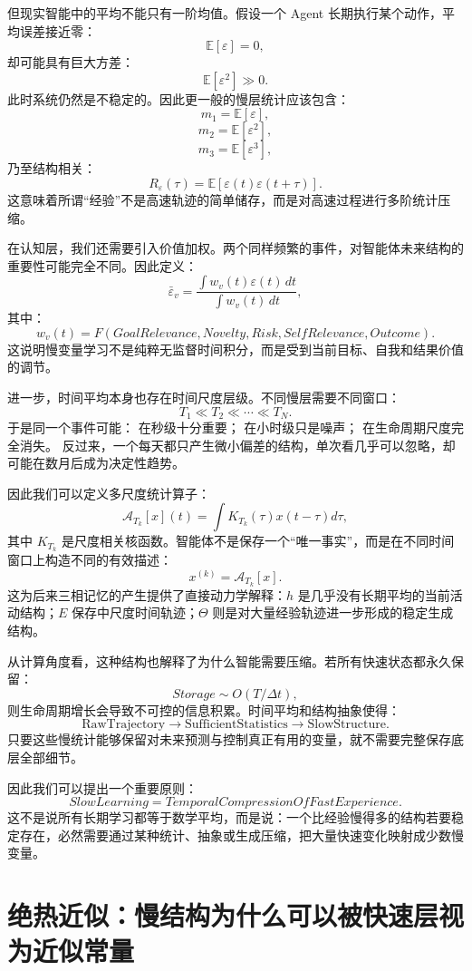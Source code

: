 但现实智能中的平均不能只有一阶均值。假设一个 Agent 长期执行某个动作，平均误差接近零：
\[
\mathbb{E}[\varepsilon]=0,
\]
却可能具有巨大方差：
\[
\mathbb{E}[\varepsilon^2]\gg0.
\]
此时系统仍然是不稳定的。因此更一般的慢层统计应该包含：
\[
m_1
=
\mathbb{E}[\varepsilon],
\]
\[
m_2
=
\mathbb{E}[\varepsilon^2],
\]
\[
m_3
=
\mathbb{E}[\varepsilon^3],
\]
乃至结构相关：
\[
R_\varepsilon(\tau)
=
\mathbb{E}
[
\varepsilon(t)
\varepsilon(t+\tau)
].
\]
这意味着所谓“经验”不是高速轨迹的简单储存，而是对高速过程进行多阶统计压缩。

在认知层，我们还需要引入价值加权。两个同样频繁的事件，对智能体未来结构的重要性可能完全不同。因此定义：
\[
\bar{\varepsilon}_{v}
=
\frac{
\int
w_v(t)
\varepsilon(t)\,dt
}{
\int
w_v(t)\,dt
},
\]
其中：
\[
w_v(t)
=
F
\left(
GoalRelevance,
Novelty,
Risk,
SelfRelevance,
Outcome
\right).
\]
这说明慢变量学习不是纯粹无监督时间积分，而是受到当前目标、自我和结果价值的调节。

进一步，时间平均本身也存在时间尺度层级。不同慢层需要不同窗口：
\[
T_1
\ll
T_2
\ll
\cdots
\ll
T_N.
\]
于是同一个事件可能：
在秒级十分重要；
在小时级只是噪声；
在生命周期尺度完全消失。
反过来，一个每天都只产生微小偏差的结构，单次看几乎可以忽略，却可能在数月后成为决定性趋势。

因此我们可以定义多尺度统计算子：
\[
\mathcal{A}_{T_k}
[x](t)
=
\int
K_{T_k}(\tau)
x(t-\tau)
d\tau,
\]
其中 $K_{T_k}$ 是尺度相关核函数。智能体不是保存一个“唯一事实”，而是在不同时间窗口上构造不同的有效描述：
\[
x^{(k)}
=
\mathcal{A}_{T_k}[x].
\]
这为后来三相记忆的产生提供了直接动力学解释：$h$ 是几乎没有长期平均的当前活动结构；$E$ 保存中尺度时间轨迹；$\Theta$ 则是对大量经验轨迹进一步形成的稳定生成结构。

从计算角度看，这种结构也解释了为什么智能需要压缩。若所有快速状态都永久保留：
\[
Storage
\sim
O(T/\Delta t),
\]
则生命周期增长会导致不可控的信息积累。时间平均和结构抽象使得：
\[
\text{RawTrajectory}
\rightarrow
\text{SufficientStatistics}
\rightarrow
\text{SlowStructure}.
\]
只要这些慢统计能够保留对未来预测与控制真正有用的变量，就不需要完整保存底层全部细节。

因此我们可以提出一个重要原则：
\[
\boxed{
SlowLearning
=
TemporalCompressionOfFastExperience.
}
\]
这不是说所有长期学习都等于数学平均，而是说：一个比经验慢得多的结构若要稳定存在，必然需要通过某种统计、抽象或生成压缩，把大量快速变化映射成少数慢变量。

\section{绝热近似：慢结构为什么可以被快速层视为近似常量}

